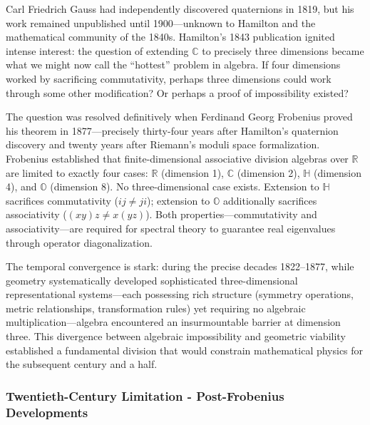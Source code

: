 Carl Friedrich Gauss had independently discovered quaternions in 1819, but his work remained unpublished until 1900—unknown to Hamilton and the mathematical community of the 1840s. Hamilton's 1843 publication ignited intense interest: the question of extending $\mathbb{C}$ to precisely three dimensions became what we might now call the ``hottest'' problem in algebra. If four dimensions worked by sacrificing commutativity, perhaps three dimensions could work through some other modification? Or perhaps a proof of impossibility existed?

The question was resolved definitively when Ferdinand Georg Frobenius proved his theorem in 1877—precisely thirty-four years after Hamilton's quaternion discovery and twenty years after Riemann's moduli space formalization. Frobenius established that finite-dimensional associative division algebras over $\mathbb{R}$ are limited to exactly four cases: $\mathbb{R}$ (dimension 1), $\mathbb{C}$ (dimension 2), $\mathbb{H}$ (dimension 4), and $\mathbb{O}$ (dimension 8). No three-dimensional case exists. Extension to $\mathbb{H}$ sacrifices commutativity ($ij \neq ji$); extension to $\mathbb{O}$ additionally sacrifices associativity ($(xy)z \neq x(yz)$). Both properties—commutativity and associativity—are required for spectral theory to guarantee real eigenvalues through operator diagonalization.

The temporal convergence is stark: during the precise decades 1822–1877, while geometry systematically developed sophisticated three-dimensional representational systems—each possessing rich structure (symmetry operations, metric relationships, transformation rules) yet requiring no algebraic multiplication—algebra encountered an insurmountable barrier at dimension three. This divergence between algebraic impossibility and geometric viability established a fundamental division that would constrain mathematical physics for the subsequent century and a half.

\subsubsection{Twentieth-Century Limitation - Post-Frobenius Developments}

